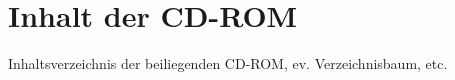 ﻿\chapter{Inhalt der CD-ROM}
\label{chap:Inhalt_CDROM}

Inhaltsverzeichnis der beiliegenden CD-ROM, ev. Verzeichnisbaum, etc.